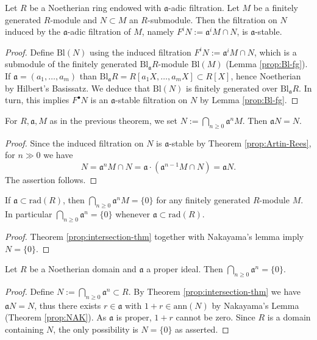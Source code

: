 \begin{theorem}\label{prop:Artin-Rees}
	Let $R$ be a Noetherian ring endowed with $\mathfrak{a}$-adic filtration. Let $M$ be a finitely generated $R$-module and $N \subset M$ an $R$-submodule. Then the filtration on $N$ induced by the $\mathfrak{a}$-adic filtration of $M$, namely $F^i N := \mathfrak{a}^i M \cap N$, is $\mathfrak{a}$-stable.
\end{theorem}
\begin{proof}
	Define $\text{Bl}(N)$ using the induced filtration $F^i N := \mathfrak{a}^i M \cap N$, which is a submodule of the finitely generated $\text{Bl}_{\mathfrak{a}} R$-module $\text{Bl}(M)$ (Lemma \ref{prop:Bl-fg}). If $\mathfrak{a} = (a_1, \ldots, a_m)$ than $\text{Bl}_{\mathfrak{a}} R = R[a_1 X, \ldots, a_m X] \subset R[X]$, hence Noetherian by Hilbert's Basissatz. We deduce that $\text{Bl}(N)$ is finitely generated over $\text{Bl}_{\mathfrak{a}} R$. In turn, this implies $F^\bullet N$ is an $\mathfrak{a}$-stable filtration on $N$ by Lemma \ref{prop:Bl-fg}.
\end{proof}

\begin{theorem}\label{prop:intersection-thm}
	For $R, \mathfrak{a}, M$ as in the previous theorem, we set $N := \bigcap_{n \geq 0} \mathfrak{a}^n M$. Then $\mathfrak{a}N = N$.
\end{theorem}
\begin{proof}
	Since the induced filtration on $N$ is $\mathfrak{a}$-stable by Theorem \ref{prop:Artin-Rees}, for $n \gg 0$ we have
	\[ N = \mathfrak{a}^n M \cap N = \mathfrak{a} \cdot (\mathfrak{a}^{n-1} M \cap N) = \mathfrak{a} N. \]
	The assertion follows.
\end{proof}

\begin{corollary}[Krull]\label{prop:Krull-intersection-rad}
	If $\mathfrak{a} \subset \mathrm{rad}(R)$, then $\bigcap_{n \geq 0} \mathfrak{a}^n M = \{0\}$ for any finitely generated $R$-module $M$. In particular $\bigcap_{n \geq 0} \mathfrak{a}^n = \{0\}$ whenever $\mathfrak{a} \subset \mathrm{rad}(R)$.
\end{corollary}
\begin{proof}
	Theorem \ref{prop:intersection-thm} together with Nakayama's lemma imply $N = \{0\}$.
\end{proof}

\begin{corollary}\label{prop:Krull-intersection-domain}
	Let $R$ be a Noetherian domain and $\mathfrak{a}$ a proper ideal. Then $\bigcap_{n \geq 0} \mathfrak{a}^n = \{0\}$.
\end{corollary}
\begin{proof}
	Define $N := \bigcap_{n \geq 0} \mathfrak{a}^n \subset R$. By Theorem \ref{prop:intersection-thm} we have $\mathfrak{a}N = N$, thus there exists $r \in \mathfrak{a}$ with $1+r \in \text{ann}(N)$ by Nakayama's Lemma (Theorem \ref{prop:NAK}). As $\mathfrak{a}$ is proper, $1+r$ cannot be zero. Since $R$ is a domain containing $N$, the only possibility is $N=\{0\}$ as asserted.
\end{proof}